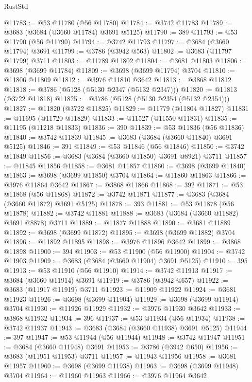 \begin{lexlean}{RustStd}
\begin{coremodule}
{\begin{coremodule}
{{{{{{{{{{{{{{{{{{{{{{{{{{{{{{{{{{{{{{{{{{{{{{{@11783 := @53 @11780 (@56 @11780)
@11784 := @3742 @11783
@11789 := @3683 (@3684 (@3660 @11784) @3691 @5125)
@11790 := 389
@11793 := @53 @11790 (@56 @11790)
@11794 := @3742 @11793
@11797 := @3684 (@3660 @11794) @3691
@11799 := @3786 (@3942 @563)
@11802 := @3683 (@11797 @11799) @3711
@11803 := @11789 @11802
@11804 := @3681 @11803
@11806 := @3698 (@3699 @11784)
@11809 := @3698 (@3699 @11794) @3704
@11810 := @11806 @11809
@11812 := @3976 @11810 @3642
@11813 := @3868 @11812
@11818 := @3786 (@5128 (@5130 @2347 (@5132 @2347)))
@11820 := @11813 (@3722 @11818)
@11825 := @3786 (@5128 (@5130 @2354 (@5132 @2354)))
@11827 := @11820 (@3722 @11825)
@11829 := @11779 (@11804 @11827)
@11831 := @11695 (@11720 @11829)
@11833 := @11527 (@11550 @11831)
@11835 := @11195 (@11218 @11833)
@11836 := 390
@11839 := @53 @11836 (@56 @11836)
@11840 := @3742 @11839
@11845 := @3683 (@3684 (@3660 @11840) @3691 @5125)
@11846 := 391
@11849 := @53 @11846 (@56 @11846)
@11850 := @3742 @11849
@11856 := @3683 (@3684 (@3660 @11850) @3691 @8921) @3711
@11857 := @11845 @11856
@11858 := @3681 @11857
@11860 := @3698 (@3699 @11840)
@11863 := @3698 (@3699 @11850) @3704
@11864 := @11860 @11863
@11866 := @3976 @11864 @3642
@11867 := @3868 @11866
@11868 := 392
@11871 := @53 @11868 (@56 @11868)
@11872 := @3742 @11871
@11877 := @3683 (@3684 (@3660 @11872) @3691 @5125)
@11878 := 393
@11881 := @53 @11878 (@56 @11878)
@11882 := @3742 @11881
@11888 := @3683 (@3684 (@3660 @11882) @3691 @8878) @3711
@11889 := @11877 @11888
@11890 := @3681 @11889
@11892 := @3698 (@3699 @11872)
@11895 := @3698 (@3699 @11882) @3704
@11896 := @11892 @11895
@11898 := @3976 @11896 @3642
@11899 := @3868 @11898
@11900 := 394
@11903 := @53 @11900 (@56 @11900)
@11904 := @3742 @11903
@11909 := @3683 (@3684 (@3660 @11904) @3691 @5125)
@11910 := 395
@11913 := @53 @11910 (@56 @11910)
@11914 := @3742 @11913
@11917 := @3684 (@3660 @11914) @3691
@11919 := @3786 (@3942 @657)
@11922 := @3683 (@11917 @11919) @3711
@11923 := @11909 @11922
@11924 := @3681 @11923
@11926 := @3698 (@3699 @11904)
@11929 := @3698 (@3699 @11914) @3704
@11930 := @11926 @11929
@11932 := @3976 @11930 @3642
@11933 := @3868 @11932
@11934 := 396
@11937 := @53 @11934 (@56 @11934)
@11938 := @3742 @11937
@11943 := @3683 (@3684 (@3660 @11938) @3691 @5125)
@11944 := 397
@11947 := @53 @11944 (@56 @11944)
@11948 := @3742 @11947
@11951 := @3684 (@3660 @11948) @3691
@11953 := @3786 (@3942 @650)
@11956 := @3683 (@11951 @11953) @3711
@11957 := @11943 @11956
@11958 := @3681 @11957
@11960 := @3698 (@3699 @11938)
@11963 := @3698 (@3699 @11948) @3704
@11964 := @11960 @11963
@11966 := @3976 @11964 @3642
}}}}}}}}}}}}}}}}}}}}}}}}}}}}}}}}}}}}}}}}}}}}}}}
\end{coremodule}}
\end{coremodule}
\end{lexlean}
